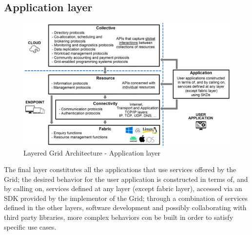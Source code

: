 \subsection{Application layer}
\begin{figure}[!ht]
    \centering
    \includegraphics[width=\linewidth]{document/chapters/chapter_2/images/application_layer.png}
    \caption{Layered Grid Architecture - Application layer}
    \label{fig:application_layer}
\end{figure}

\noindent The final layer constitutes all the applications that use services offered by the Grid; the desired behavior for the user application is constructed in terms of, and by calling on, services defined at any layer (except fabric layer), accessed via an SDK provided by the implementor of the Grid; through a combination of services defined in the other layers, software development and possibly collaborating with third party libraries, more complex behaviors con be built in order to satisfy specific use cases.
